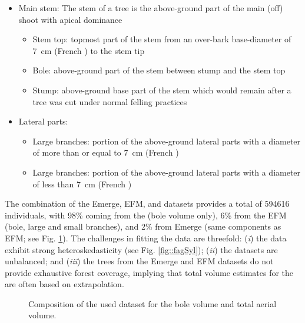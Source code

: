 \begin{itemize}
	\item Main stem: The stem of a tree is the above-ground part of the main (off) shoot with apical dominance
	\begin{itemize}
		\item Stem top: topmost part of the stem from an over-bark base-diameter of \qty{7}{\centi\metre} (French \NFI) to the stem tip
		\item Bole: above-ground part of the stem between stump and the stem top
		\item Stump: above-ground base part of the stem which would remain after a tree was cut under normal felling practices
	\end{itemize}
	\item Lateral parts:
	\begin{itemize}
		\item Large branches: portion of the above-ground lateral parts with a diameter of more than or equal to \qty{7}{\centi\metre} (French \NFI)
		\item Large branches: portion of the above-ground lateral parts with a diameter of less than \qty{7}{\centi\metre} (French \NFI)
	\end{itemize}
\end{itemize}

The combination of the Emerge, EFM, and \NFI{} datasets provides a total of \num{594616} individuals, with 98\% coming from the \NFI{} (bole volume only), 6\% from the EFM (bole, large and small branches), and 2\% from Emerge (same components as EFM; see Fig. \ref{fig::compo}). The challenges in fitting the data are threefold: (\textit{i}) the data exhibit strong heteroskedasticity (see Fig. \ref{fig::fagSyl}); (\textit{ii}) the datasets are unbalanced; and (\textit{iii}) the trees from the Emerge and EFM datasets do not provide exhaustive forest coverage, implying that total volume estimates for the \NFI{} are often based on extrapolation.

\begin{figure}
	\centering
	
	\caption{Composition of the used dataset for the bole volume and total aerial volume.\label{fig::compo}}
\end{figure}


